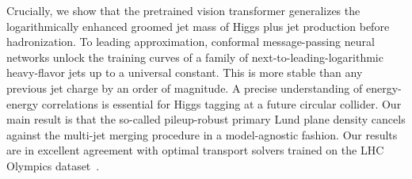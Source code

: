 Crucially, we show that the pretrained vision transformer generalizes
the logarithmically enhanced groomed jet mass of Higgs plus jet
production before hadronization. To leading approximation, conformal
message-passing neural networks unlock the training curves of a family
of next-to-leading-logarithmic heavy-flavor jets up to a universal
constant. This is more stable than any previous jet charge by an order
of magnitude. A precise understanding of energy-energy correlations is
essential for Higgs tagging at a future circular collider. Our main
result is that the so-called pileup-robust primary Lund plane density
cancels against the multi-jet merging procedure in a model-agnostic
fashion. Our results are in excellent agreement with optimal transport
solvers trained on the LHC Olympics
dataset~\cite{TPC:0332-Pileup-Particles-Past-Present-and-Future-September-27-2026}.

